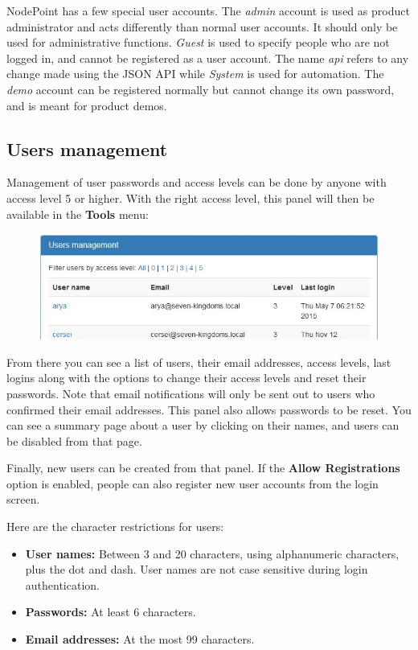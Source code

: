 \documentclass[11pt]{article}
\begin{document}
NodePoint has a few special user accounts. The \textit{admin} account is used as product administrator and acts differently than normal user accounts. It should only be used for administrative functions. \textit{Guest} is used to specify people who are not logged in, and cannot be registered as a user account. The name \textit{api} refers to any change made using the JSON API while \textit{System} is used for automation. The \textit{demo} account can be registered normally but cannot change its own password, and is meant for product demos.

\subsection{Users management}
Management of user passwords and access levels can be done by anyone with access level 5 or higher. With the right access level, this panel will then be available in the \textbf{Tools} menu:

\begin{figure}[h]
\includegraphics{userman.jpg}
\end{figure}

From there you can see a list of users, their email addresses, access levels, last logins along with the options to change their access levels and reset their passwords. Note that email notifications will only be sent out to users who confirmed their email addresses. This panel also allows passwords to be reset. You can see a summary page about a user by clicking on their names, and users can be disabled from that page.

Finally, new users can be created from that panel. If the \textbf{Allow Registrations} option is enabled, people can also register new user accounts from the login screen.

Here are the character restrictions for users:

\begin{itemize}
\item \textbf{User names:} Between 3 and 20 characters, using alphanumeric characters, plus the dot and dash. User names are not case sensitive during login authentication.
\item \textbf{Passwords:} At least 6 characters.
\item \textbf{Email addresses:} At the most 99 characters.
\end{itemize}
\end{document}
